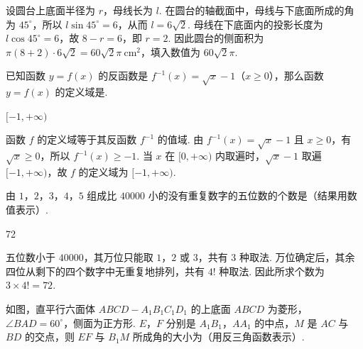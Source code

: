 \begin{solution}
设圆台上底面半径为 \(r\)，母线长为 \(l\). 在圆台的轴截面中，母线与下底面所成的角为 \(45^\circ\)，所以 \(l\sin45^\circ=6\)，从而 \(l=6\sqrt{2}\). 母线在下底面内的投影长度为 \(l\cos45^\circ=6\)，故 \(8-r=6\)，即 \(r=2\). 因此圆台的侧面积为 \(\pi(8+2)\cdot6\sqrt{2}=60\sqrt{2}\pi\ \mathrm{cm}^2\)，填入数值为 \(60\sqrt{2}\pi\).
\end{solution}

\begin{problem}
已知函数 \(y = f(x)\) 的反函数是 \(f^{-1}(x)=\sqrt{x}-1\)（\(x \geqslant 0\)），那么函数 \(y = f(x)\) 的定义域是\fillinblank{}.
\end{problem}

\begin{answer}
\([-1,+\infty)\)
\end{answer}

\begin{solution}
函数 \(f\) 的定义域等于其反函数 \(f^{-1}\) 的值域. 由 \(f^{-1}(x)=\sqrt{x}-1\) 且 \(x\geqslant0\)，有 \(\sqrt{x}\geqslant0\)，所以 \(f^{-1}(x)\geqslant-1\). 当 \(x\) 在 \([0,+\infty)\) 内取遍时，\(\sqrt{x}-1\) 取遍 \([-1,+\infty)\)，故 \(f\) 的定义域为 \([-1,+\infty)\).
\end{solution}

\begin{problem}
由 \(1\)，\(2\)，\(3\)，\(4\)，\(5\) 组成比 \(40000\) 小的没有重复数字的五位数的个数是\fillinblank{}（结果用数值表示）.
\end{problem}

\begin{answer}
72
\end{answer}

\begin{solution}
五位数小于 \(40000\)，其万位只能取 \(1\)，\(2\) 或 \(3\)，共有 \(3\) 种取法. 万位确定后，其余四位从剩下的四个数字中无重复地排列，共有 \(4!\) 种取法. 因此所求个数为 \(3\times4!=72\).
\end{solution}

\begin{problem}
如图，直平行六面体 \(ABCD-A_1B_1C_1D_1\) 的上底面 \(ABCD\) 为菱形，\(\angle BAD = 60^\circ\)，侧面为正方形. \(E\)，\(F\) 分别是 \(A_1B_1\)，\(AA_1\) 的中点，\(M\) 是 \(AC\) 与 \(BD\) 的交点，则 \(EF\) 与 \(B_1M\) 所成角的大小为\fillinblank{}（用反三角函数表示）.

\end{problem}


